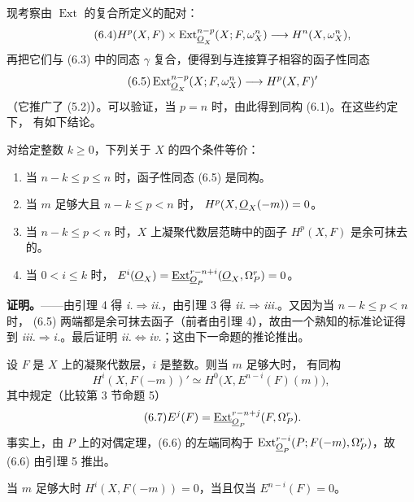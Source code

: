 现考察由 $\operatorname{Ext}$ 的复合所定义的配对：
\begin{equation}\tag{6.4}
  H^{p}(X,F)\times
  \operatorname{Ext}_{\underline{O}_X}^{n-p}(X;F,\omega_X^{n})
  \longrightarrow H^{n}(X,\omega_X^{n}),
\end{equation}
再把它们与 (6.3) 中的同态 $\gamma$ 复合，便得到与连接算子相容的函子性同态
\begin{equation}\tag{6.5}
  \operatorname{Ext}_{\underline{O}_X}^{n-p}(X;F,\omega_X^{n})
  \longrightarrow H^{p}(X,F)'
\end{equation}
（它推广了 (5.2)）。可以验证，当 $p=n$ 时，由此得到同构 (6.1)。在这些约定下，
有如下结论。

 对给定整数 $k\geq0$，下列关于 $X$ 的四个条件等价：
\begin{enumerate}
  \item[\textit{i.}] 当 $n-k\leq p\leq n$ 时，函子性同态 (6.5) 是同构。
  \item[\textit{ii.}] 当 $m$ 足够大且 $n-k\leq p<n$ 时，
    $H^{p}(X,\underline{O}_X(-m))=0$。
  \item[\textit{iii.}] 当 $n-k\leq p<n$ 时，$X$ 上凝聚代数层范畴中的函子
    $H^{p}(X,F)$ 是余可抹去的。
  \item[\textit{iv.}] 当 $0<i\leq k$ 时，
    $E^{i}(\underline{O}_X)=\underline{\operatorname{Ext}}_{\underline{O}_P}^{r-n+i}(\underline{O}_X,\Omega_P^{r})=0$。
\end{enumerate}

\noindent\textbf{证明。}——由引理 4 得
\textit{i.}$\Rightarrow$\textit{ii.}，由引理 3 得
\textit{ii.}$\Rightarrow$\textit{iii.}。又因为当 $n-k\leq p<n$ 时，
(6.5) 两端都是余可抹去函子（前者由引理 4），故由一个熟知的标准论证得到
\textit{iii.}$\Rightarrow$\textit{i.}。最后证明
\textit{ii.}$\Leftrightarrow$\textit{iv.}；这由下一命题的推论推出。

 设 $F$ 是 $X$ 上的凝聚代数层，$i$ 是整数。则当 $m$ 足够大时，
有同构
\begin{equation}\tag{6.6}
  H^{i}(X,F(-m))'
  \simeq H^{0}\bigl(X,E^{n-i}(F)(m)\bigr),
\end{equation}
其中规定（比较第 3 节命题 5）
\begin{equation}\tag{6.7}
  E^{j}(F)=\underline{\operatorname{Ext}}_{\underline{O}_P}^{r-n+j}(F,\Omega_P^{r}).
\end{equation}
事实上，由 $P$ 上的对偶定理，(6.6) 的左端同构于
$\operatorname{Ext}_{\underline{O}_P}^{r-i}(P;F(-m),\Omega_P^{r})$，故 (6.6)
由引理 5 推出。

 当 $m$ 足够大时 $H^{i}(X,F(-m))=0$，当且仅当
$E^{n-i}(F)=0$。

